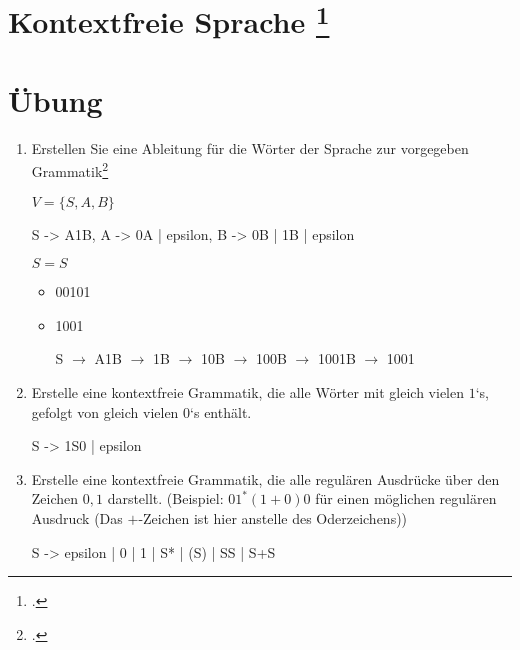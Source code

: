 \documentclass{lehramt-informatik-aufgabe}
\begin{document}
\section{Kontextfreie Sprache
\footcite{theo:fs:2}}

\section{Übung}
\begin{enumerate}
\item Erstellen Sie eine Ableitung für die Wörter der Sprache zur
vorgegeben Grammatik\footcite[Seite 10]{theo:fs:2}

$V = \{ S, A, B \}$


\begin{liProduktionsRegeln}
S -> A1B,
A -> 0A | epsilon,
B -> 0B | 1B | epsilon
\end{liProduktionsRegeln}

$S = S$

\begin{itemize}
\item 00101

\begin{liAntwort}

\end{liAntwort}

\item 1001

\begin{liAntwort}
S $\rightarrow$
A1B $\rightarrow$
1B $\rightarrow$
10B $\rightarrow$
100B $\rightarrow$
1001B $\rightarrow$
1001
\end{liAntwort}
\end{itemize}

\item Erstelle eine kontextfreie Grammatik, die alle Wörter mit gleich
vielen $1$‘s, gefolgt von gleich vielen $0$‘s enthält.

\begin{liAntwort}
\begin{liProduktionsRegeln}
S -> 1S0 | epsilon
\end{liProduktionsRegeln}
\end{liAntwort}

\item Erstelle eine kontextfreie Grammatik, die alle regulären Ausdrücke
über den Zeichen $0,1$ darstellt.
(Beispiel: $01^* (1 + 0)0$ für einen möglichen regulären Ausdruck
(Das $+$-Zeichen ist hier anstelle des Oderzeichens))

\begin{liAntwort}

\begin{liProduktionsRegeln}
S -> epsilon | 0 | 1 | S* | (S) | SS | S+S
\end{liProduktionsRegeln}
\end{liAntwort}

\end{enumerate}
\end{document}
